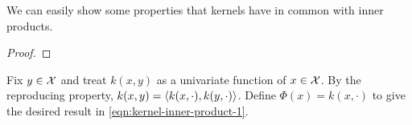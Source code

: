 

\begin{definition}[Kernel]
    \label{def:kernel}
    \cite{rudin2020notes}
    
\end{definition}

We can easily show some properties that kernels have in common with inner products.

\begin{lemma}
    \label{lem:properties-of-kernels}
    \cite{rudin2020notes}
    
\end{lemma}
\begin{proof}
    
\end{proof}

\begin{definition}
    \label{def:feature-map}
    \cite{hofmann2008kernel}
    
\end{definition}



\begin{definition}
    \label{def:reproducing-kernel-hilbert-space}
    \cite{hofmann2008kernel}
    
\end{definition}

Fix \(y \in \mathcal{X}\) and treat \(k(x,y)\) as a univariate function of \(x \in \mathcal{X}\).
By the reproducing property, \(k(x,y) = \left\langle k(x,\cdot),k(y,\cdot) \right\rangle\).
Define \(\Phi(x) = k(x,\cdot)\) to give the desired result in \cref{eqn:kernel-inner-product-1}.